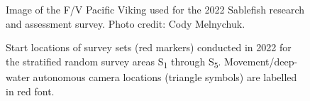 \documentclass[12pt]{article}\usepackage[]{graphicx}\usepackage[]{color}
\begin{document}
\begin{figure}[htb]

{\centering {} 

}

\caption{Image of the F/V Pacific Viking used for the 2022 Sablefish research and assessment survey. Photo credit: Cody Melnychuk.}\label{fig:figure2}
\end{figure}
\clearpage


\begin{figure}[htb]

{\centering {} 

}

\caption{Start locations of survey sets (red markers) conducted in 2022 for the stratified random survey areas S\textsubscript{1} through S\textsubscript{5}. Movement/deep-water autonomous camera locations (triangle symbols) are labelled in red font.}\label{fig:figure3}
\end{figure}
\clearpage
\end{document}
